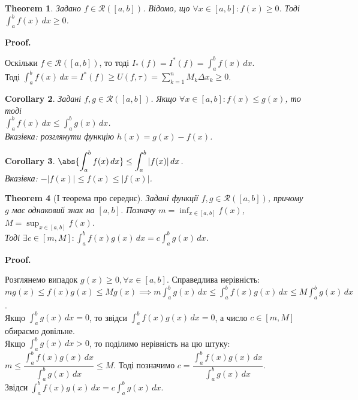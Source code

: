 \documentclass[a4paper, 10pt]{article}
\makeatletter
\def\huge{\displaystyle}
\def\qed{$\blacksquare$}
\theoremstyle{theoremdd}
\newtheorem{theorem}{Theorem}[subsection]
\theoremstyle{theoremdd}
\theoremstyle{theoremdd}
\theoremstyle{theoremdd}
\theoremstyle{theoremdd}
\theoremstyle{theoremdd}
\theoremstyle{theoremdd}
\theoremstyle{theoremdd}
\theoremstyle{theoremdd}
\newtheorem{corollary}[theorem]{Corollary}
\renewenvironment{proof}[1][Proof.\\]{\par
\pushQED{\hfill \qed}%
\normalfont \topsep6\p@\@plus6\p@\relax
\trivlist
\item\relax
{\bfseries
#1\@addpunct{.}}\hspace\labelsep\ignorespaces
}{%
\popQED\endtrivlist\@endpefalse
}
\makeatother
\begin{document}
\begin{theorem}
Задано $f \in \mathcal{R}([a,b])$. Відомо, що $\forall x \in [a,b]: f(x) \geq 0$. Тоді $\huge\int_a^b f(x)\,dx \geq 0$.
\end{theorem}

\begin{proof}
Оскільки $f \in \mathcal{R}([a,b])$, то тоді $I_*(f) = I^*(f) = \huge\int_a^b f(x) \,dx$.\\
Тоді $\huge\int_a^b f(x)\,dx = I^*(f) \geq U(f, \tau) = \huge\sum_{k=1}^n M_k \Delta x_k \geq 0$.
\end{proof}

\begin{corollary}
Задані $f,g \in \mathcal{R}([a,b])$. Якщо $\forall x \in [a,b]: f(x) \leq g(x)$, то тоді \\
$\huge\int_a^b f(x)\,dx \leq \int_a^b g(x)\,dx$.\\
\textit{Вказівка: розглянути функцію $h(x) = g(x) - f(x)$.}
\end{corollary}

\begin{corollary}
$\huge \abs{\int_a^b f(x)\,dx} \leq \int_a^b |f(x)|\,dx$.\\
\textit{Вказівка: $-|f(x)| \leq f(x) \leq |f(x)|$.}
\end{corollary}

\begin{theorem}[I теорема про середнє]
Задані функції $f,g \in \mathcal{R}([a,b])$, причому $g$ має однаковий знак на $[a,b]$. Позначу $m = \huge \inf_{x \in [a,b]}f(x)$, $M = \huge \sup_{x \in [a,b]}f(x)$. \\ 
Тоді $\exists c \in \huge [m,M]: \int_a^b f(x)g(x)\,dx = c \int_a^b g(x)\,dx$.
\end{theorem}

\begin{proof}
Розглянемо випадок $g(x) \geq 0, \forall x \in [a,b]$. Справедлива нерівність:\\
$mg(x) \leq f(x)g(x) \leq M g(x) \implies \huge m\int_a^b g(x)\,dx \leq \int_a^b f(x)g(x)\,dx \leq M \int_a^b g(x)\,dx$.\\
Якщо $\huge\int_a^b g(x)\,dx = 0$, то звідси $\huge\int_a^b f(x)g(x)\,dx = 0$, а число $c \in [m,M]$ обираємо довільне.
\bigskip \\
Якщо $\huge\int_a^b g(x)\,dx > 0$, то поділимо нерівність на цю штуку:\\
$m \leq \dfrac{\huge\int_a^b f(x)g(x)\,dx}{\huge\int_a^b g(x)\,dx} \leq M$. Тоді позначимо $c = \dfrac{\huge\int_a^b f(x)g(x)\,dx}{\huge\int_a^b g(x)\,dx}$. \\
Звідси $\huge\int_a^b f(x)g(x)\,dx = c \int_a^b g(x)\,dx$.
\end{proof}
\end{document}
